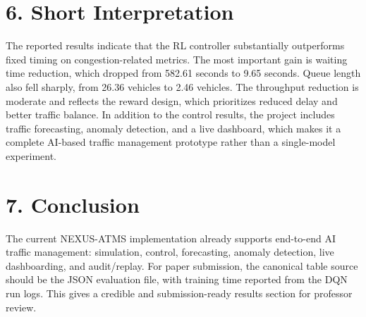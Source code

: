 \documentclass[11pt,a4paper]{article}
\begin{document}
\section*{6. Short Interpretation}
The reported results indicate that the RL controller substantially outperforms fixed timing on congestion-related metrics. The most important gain is waiting time reduction, which dropped from 582.61 seconds to 9.65 seconds. Queue length also fell sharply, from 26.36 vehicles to 2.46 vehicles. The throughput reduction is moderate and reflects the reward design, which prioritizes reduced delay and better traffic balance. In addition to the control results, the project includes traffic forecasting, anomaly detection, and a live dashboard, which makes it a complete AI-based traffic management prototype rather than a single-model experiment.

\section*{7. Conclusion}
The current NEXUS-ATMS implementation already supports end-to-end AI traffic management: simulation, control, forecasting, anomaly detection, live dashboarding, and audit/replay. For paper submission, the canonical table source should be the JSON evaluation file, with training time reported from the DQN run logs. This gives a credible and submission-ready results section for professor review.
\end{document}
